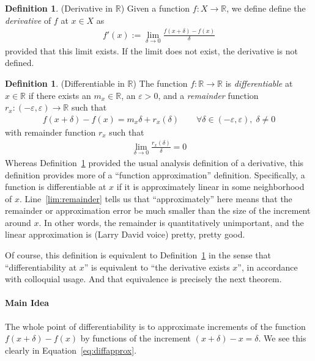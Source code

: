 \documentclass[12pt]{article}
\numberwithin{equation}{section} %
\theoremstyle{plain}
\theoremstyle{definition}
\newtheorem{defn}[thm]{Definition}
\theoremstyle{remark}
\newcommand{\R}{\mathbb{R}}
\begin{document}
\begin{defn}{(Derivative in $\R$)}
\label{defn:derivative}
Given a function $f:X\rightarrow\R$, we define define the
\emph{derivative} of $f$ at $x\in X$ as
\begin{align*}
  f'(x) := \lim_{\delta\rightarrow0}
  \frac{f(x+\delta)-f(x)}{\delta}
\end{align*}
provided that this limit exists. If the limit does not exist, the
derivative is not defined.
\end{defn}

\begin{defn}{(Differentiable in $\R$)}
\label{defn:diffable}
The function $f:\R\rightarrow\R$ is \emph{differentiable} at $x\in\R$ if
there exists an $m_x\in\R$, an $\varepsilon>0$, and a \emph{remainder}
function $r_x:(-\varepsilon,\varepsilon)\rightarrow\R$ such that
\begin{align}
  \label{eq:diffapprox}
  f(x+\delta)-f(x) = m_x \delta + r_x(\delta)
  \qquad \forall \delta\in(-\varepsilon,\varepsilon), \; \delta \neq 0
\end{align}
with remainder function $r_x$ such that
\begin{align}
  \label{lim:remainder}
  \lim_{\delta\rightarrow 0}
  \frac{r_x(\delta)}{\delta}=0
\end{align}
Whereas Definition~\ref{defn:derivative} provided the usual analysis
definition of a derivative, this definition provides more of a
``function approximation'' definition. Specifically, a function is
differentiable at $x$ if it is approximately linear in some neighborhood
of $x$.  Line~\ref{lim:remainder} tells us that ``approximately'' here
means that the remainder or approximation error be much smaller than
the size of the increment around $x$. In other words, the remainder is
quantitatively unimportant, and the linear approximation is (Larry David
voice) pretty, pretty good.

Of course, this definition is equivalent to
Definition~\ref{defn:derivative} in the sense that ``differentiability
at $x$'' is equivalent to ``the derivative exists $x$'', in accordance
with colloquial usage. And that equivalence is precisely the next
theorem.
\end{defn}

\paragraph{Main Idea} The whole point of differentiability is to
approximate increments of the function $f(x+\delta)-f(x)$ by functions
of the increment $(x+\delta)-x=\delta$. We see this clearly in
Equation~\ref{eq:diffapprox}.
\end{document}

